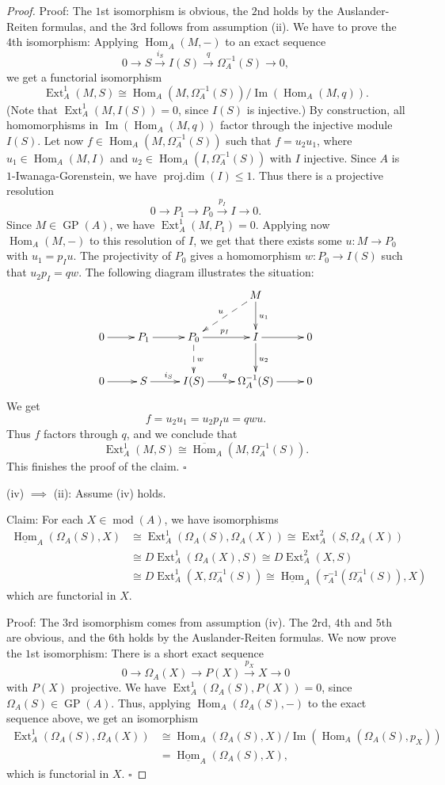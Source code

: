 \documentclass[12pt,reqno]{amsart}
\theoremstyle{definition}
\newcommand{\df}{\colon}
\newcommand{\md}{\operatorname{mod}}
\newcommand{\pdim}{\operatorname{proj.dim}}
\newcommand{\GP}{\operatorname{GP}}
\newcommand{\Hom}{\operatorname{Hom}}
\newcommand{\Ext}{\operatorname{Ext}}
\newcommand{\Ima}{\operatorname{Im}}
\begin{document}
\begin{proof}
Proof:
The $1$st isomorphism is obvious, the $2$nd holds by the Auslander-Reiten formulas, and the $3$rd follows from assumption (ii).
We have to prove the $4$th isomorphism:
Applying $\Hom_A(M,-)$ to an exact sequence
$$
0 \to S \xrightarrow{i_S} I(S) \xrightarrow{q} \Omega_A^{-1}(S) \to 0,
$$
we get a functorial isomorphism
$$
\Ext_A^1(M,S) \cong \Hom_A(M,\Omega_A^{-1}(S))/\Ima(\Hom_A(M,q)).
$$
(Note that $\Ext_A^1(M,I(S)) = 0$, since $I(S)$ is injective.)
By construction, all homomorphisms in $\Ima(\Hom_A(M,q))$ factor through the
injective module $I(S)$.
Let now $f \in \Hom_A(M,\Omega_A^{-1}(S))$ such that $f = u_2u_1$, where
$u_1 \in \Hom_A(M,I)$ and $u_2 \in \Hom_A(I,\Omega_A^{-1}(S))$ with $I$ injective.
Since $A$ is $1$-Iwanaga-Gorenstein, we have $\pdim(I) \le 1$.
Thus there is a projective resolution
$$
0 \to P_1 \to P_0 \xrightarrow{p_I} I \to 0.
$$
Since $M \in \GP(A)$, we have $\Ext_A^1(M,P_1) = 0$.
Applying now $\Hom_A(M,-)$ to this resolution of $I$, we get that
there exists some $u\df M \to P_0$ with $u_1 = p_Iu$.
The projectivity of $P_0$ gives a homomorphism $w\df P_0 \to I(S)$ such that
$u_2p_I = qw$.
The following diagram illustrates the situation:
$$
\xymatrix{
&&& M \ar[d]^{u_1}\ar@{-->}[dl]_{u}
\\
0 \ar[r] & P_1 \ar[r] & P_0 \ar[r]^{p_I}\ar@{-->}[d]^w & I \ar[r]\ar[d]^{u_2} & 0
\\
0 \ar[r] & S \ar[r]^{i_S} & I(S) \ar[r]^q& \Omega_A^{-1}(S) \ar[r] & 0
}
$$
We get
$$
f = u_2u_1 = u_2p_Iu = qwu.
$$
Thus $f$ factors through $q$, and we conclude that
$$
\Ext_A^1(M,S) \cong \overline{\Hom}_A(M,\Omega_A^{-1}(S)).
$$
This finishes the proof of the claim.
$\square$

(iv) $\implies$ (ii):
Assume (iv) holds.

Claim:
For each $X \in \md(A)$, we have isomorphisms
\begin{align*}
\underline{\Hom}_A(\Omega_A(S),X) &\cong \Ext_A^1(\Omega_A(S),\Omega_A(X))
\cong \Ext_A^2(S,\Omega_A(X))
\\
&\cong D\!\Ext_A^1(\Omega_A(X),S)
\cong D\!\Ext_A^2(X,S)
\\
&\cong D\!\Ext_A^1(X,\Omega_A^{-1}(S))
\cong \underline{\Hom}_A(\tau_A^{-1}(\Omega_A^{-1}(S)),X)
\end{align*}
which are functorial in $X$.

Proof:
The 
$3$rd isomorphism comes from assumption (iv). 
The $2$rd, $4$th and $5$th are obvious, and the $6$th holds by the Auslander-Reiten formulas. 
We now prove the $1$st isomorphism:
There is a short exact sequence
$$
0 \to \Omega_A(X) \to P(X) \xrightarrow{p_X} X \to 0
$$
with $P(X)$ projective.
We have $\Ext_A^1(\Omega_A(S),P(X)) = 0$, since $\Omega_A(S) \in \GP(A)$.
Thus, applying $\Hom_A(\Omega_A(S),-)$ to the exact sequence above, we get
an isomorphism
\begin{align*}
\Ext_A^1(\Omega_A(S),\Omega_A(X)) &\cong \Hom_A(\Omega_A(S),X)/\Ima(\Hom_A(\Omega_A(S),p_X))
\\
&= \underline{\Hom}_A(\Omega_A(S),X),
\end{align*}
which is functorial in $X$.
$\square$


\end{proof}
\end{document}
